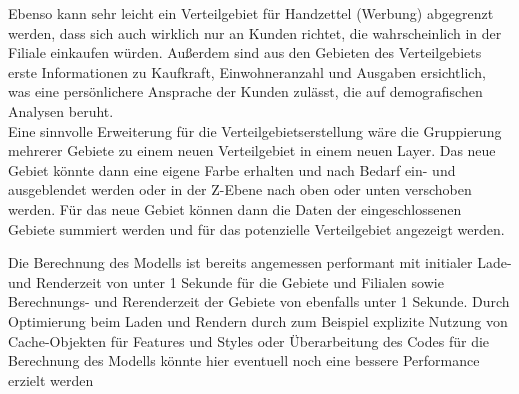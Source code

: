 Ebenso kann sehr leicht ein Verteilgebiet für Handzettel (Werbung) abgegrenzt werden, dass sich auch wirklich nur an Kunden richtet, die wahrscheinlich in der Filiale einkaufen würden.
Außerdem sind aus den Gebieten des Verteilgebiets erste Informationen zu Kaufkraft, Einwohneranzahl und Ausgaben ersichtlich, was eine persönlichere Ansprache der Kunden zulässt, die auf demografischen Analysen beruht.\\
Eine sinnvolle Erweiterung für die Verteilgebietserstellung wäre die Gruppierung mehrerer Gebiete zu einem neuen Verteilgebiet in einem neuen Layer.
Das neue Gebiet könnte dann eine eigene Farbe erhalten und nach Bedarf ein- und ausgeblendet werden oder in der Z-Ebene nach oben oder unten verschoben werden.
Für das neue Gebiet können dann die Daten der eingeschlossenen Gebiete summiert werden und für das potenzielle Verteilgebiet angezeigt werden.

Die Berechnung des Modells ist bereits angemessen performant mit initialer Lade- und Renderzeit von unter 1 Sekunde für die Gebiete und Filialen sowie Berechnungs- und Rerenderzeit der Gebiete von ebenfalls unter 1 Sekunde.
Durch Optimierung beim Laden und Rendern durch zum Beispiel explizite Nutzung von Cache-Objekten für Features und Styles oder Überarbeitung des Codes für die Berechnung des Modells könnte hier eventuell noch eine bessere Performance erzielt werden

